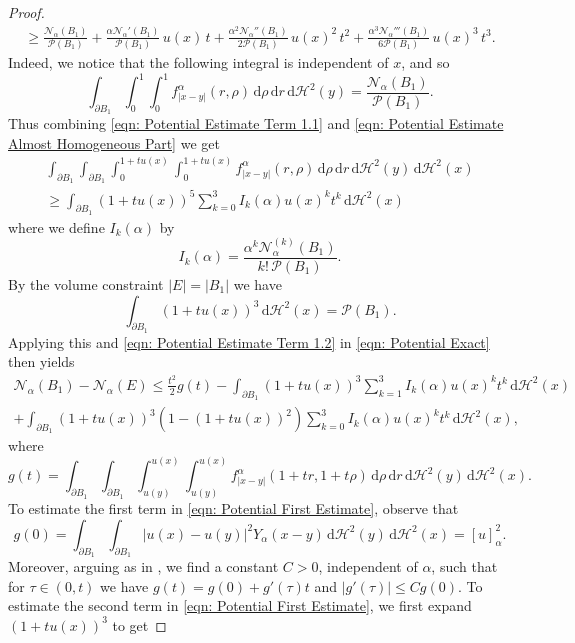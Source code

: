 \documentclass[a4paper,11pt,reqno]{amsart}
\numberwithin{equation}{section}
\theoremstyle{remark}
\theoremstyle{definition}
\newcommand{\dd}{\,\mathrm{d}}
\newcommand{\nl}{\mathcal{N}_{\alpha}}
\renewcommand{\leq}{\leqslant}
\renewcommand{\geq}{\geqslant}
\newcommand{\Pe}{\mathcal{P}}
\begin{document}
\begin{proof}
\begin{multline}
		 \geq \frac{\nl(B_1)}{\Pe(B_1)} +\frac{\alpha \nl'(B_1)}{\Pe(B_1)}\,u(x)\,t +\frac{\alpha^2\nl''(B_1)}{2\Pe(B_1)}\,u(x)^2\,t^2+\frac{\alpha^3\nl'''(B_1)}{6\Pe(B_1)}\,u(x)^3\,t^3.
	\end{multline}
Indeed, we notice that the following integral is independent of $x$, and so
	\[
		\int_{\partial B_1} \int_0^1\int_0^1 f_{|x-y|}^{\alpha}(r,\rho) \dd\rho \dd r \dd\mathcal{H}^2(y) = \frac{\nl(B_1)}{\Pe(B_1)}.
	\]
Thus combining \eqref{eqn: Potential Estimate Term 1.1} and \eqref{eqn: Potential Estimate Almost Homogeneous Part} we get
	\begin{multline}\label{eqn: Potential Estimate Term 1.2}
		\int_{\partial B_1}\int_{\partial B_1}\int_0^{1+t u(x)}\int_0^{1+tu(x)} f_{|x-y|}^{\alpha}(r,\rho) \dd\rho \dd r \dd\mathcal{H}^2(y)\dd\mathcal{H}^2(x) \\
					\geq \int_{\partial B_1}(1+tu(x))^5\sum_{k=0}^3I_k(\alpha) u(x)^kt^k\dd\mathcal{H}^2(x)
	\end{multline}
where we define $I_k(\alpha)$ by
	\[
		I_k(\alpha) = \frac{\alpha^k \nl^{(k)}(B_1)}{k!\,\Pe(B_1)}.
	\]
By the volume constraint $|E|=|B_1|$ we have
	\begin{equation}\label{eqn: Volume Constraint}
		\int_{\partial B_1} (1+tu(x))^3 \dd\mathcal{H}^2(x) = \Pe(B_1).
	\end{equation}
Applying this and \eqref{eqn: Potential Estimate Term 1.2} in \eqref{eqn: Potential Exact} then yields
	\begin{multline}\label{eqn: Potential First Estimate}
		\nl(B_1)-\nl(E)\leq \frac{t^2}{2}g(t)-\int_{\partial B_1} (1+tu(x))^3\sum_{k=1}^3 I_k(\alpha)u(x)^kt^k\dd\mathcal{H}^2(x) \\
				+\int_{\partial B_1}(1+tu(x))^3(1-(1+tu(x))^2)\sum_{k=0}^3 I_k(\alpha)u(x)^kt^k\dd\mathcal{H}^2(x), 
	\end{multline}
where 
	\[
		g(t) = \int_{\partial B_1}\int_{\partial B_1} \int_{u(y)}^{u(x)}\int_{u(y)}^{u(x)} f_{|x-y|}^{\alpha}(1+tr,1+t\rho) \dd\rho \dd r \dd\mathcal{H}^2(y)\dd\mathcal{H}^2(x).
	\]
To estimate the first term in \eqref{eqn: Potential First Estimate}, observe that
	\[
		g(0) = \int_{\partial B_1}\int_{\partial B_1} |u(x)-u(y)|^2Y_{\alpha}(x-y) \dd\mathcal{H}^2(y)\dd\mathcal{H}^2(x) = [u]_{\alpha}^2.
	\]
Moreover, arguing as in \cite[Appendix D]{FFMMM}, we find a constant $C>0$, independent of $\alpha$, such that for $\tau\in (0,t)$ we have $g(t)=g(0)+g'(\tau)t$ and $|g'(\tau)| \leq Cg(0)$. To estimate the second term in \eqref{eqn: Potential First Estimate}, we first expand $(1+tu(x))^3$ to get

\end{proof}
\end{document}
